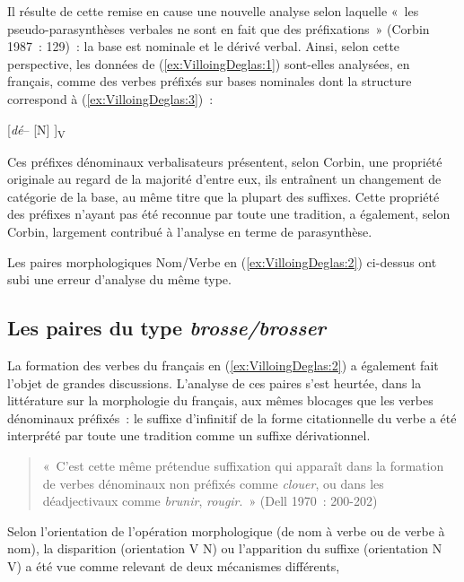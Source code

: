 \documentclass[output=paper]{langsci/langscibook}
\begin{document}
Il résulte de cette remise en cause une nouvelle analyse selon laquelle
«~les pseudo-parasynthèses verbales ne sont en fait que des
préfixations~» (Corbin 1987~: 129)~: la base est nominale et le dérivé
verbal. Ainsi, selon cette perspective, les données de (\ref{ex:VilloingDeglas:1}) sont-elles
analysées, en français, comme des verbes préfixés sur bases nominales
dont la structure correspond à (\ref{ex:VilloingDeglas:3})~:

\ea\label{ex:VilloingDeglas:3}{[\emph{dé}-- {[}N{]} {]}}\textsubscript{V}
\z

Ces préfixes dénominaux verbalisateurs présentent, selon Corbin, une
propriété originale au regard de la majorité d'entre eux, ils entraînent
un changement de catégorie de la base, au même titre que la plupart des
suffixes. Cette propriété des préfixes n'ayant pas été reconnue par
toute une tradition, a également, selon Corbin, largement contribué à
l'analyse en terme de parasynthèse.

Les paires morphologiques Nom/Verbe en (\ref{ex:VilloingDeglas:2}) ci-dessus ont subi une erreur d'analyse du même type.

\subsection{\texorpdfstring{Les paires du type
\emph{brosse/brosser}}{Les paires du type brosse/brosser}}\label{les-paires-du-type-brossebrosser}

La formation des verbes du français en (\ref{ex:VilloingDeglas:2}) a également fait l'objet de
grandes discussions. L'analyse de ces paires s'est heurtée, dans la
littérature sur la morphologie du français, aux mêmes blocages que les
verbes dénominaux préfixés~: le suffixe d'infinitif de la forme
citationnelle du verbe a été interprété par toute une tradition comme un
suffixe dérivationnel.

\begin{quote}«~C'est cette même prétendue suffixation qui apparaît dans la formation
de verbes dénominaux non préfixés comme \emph{clouer}, ou dans les
déadjectivaux comme \emph{brunir}, \emph{rougir}.~» (Dell 1970~:
200-202)~
\end{quote}

Selon l'orientation de l'opération morphologique (de nom à verbe ou de
verbe à nom), la disparition (orientation V \textrightarrow{} N) ou l'apparition du
suffixe (orientation N \textrightarrow{} V) a été vue comme relevant de deux mécanismes
différents,
\end{document}
